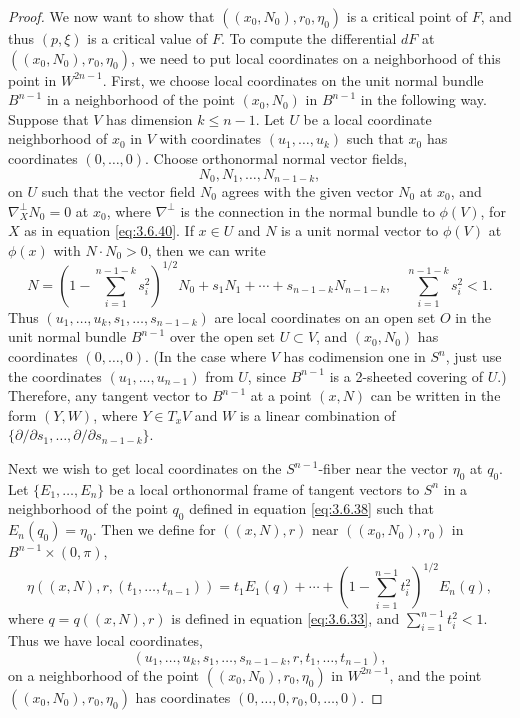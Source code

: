 \documentclass[12pt]{article}
\begin{document}
\begin{proof}
We now want to show that $((x_0,N_0), r_0, \eta_0)$ is a critical point of $F$, and thus $(p,\xi)$ is a critical
value of $F$. To compute the differential $dF$ at $((x_0,N_0), r_0, \eta_0)$, we need to put local coordinates
on a neighborhood of this point in $W^{2n-1}$.  First, we choose local coordinates on the unit normal  bundle
$B^{n-1}$ in a neighborhood of the point $(x_0, N_0)$ in $B^{n-1}$ in the following way.  
Suppose that $V$ has dimension $k \leq n-1$.
Let $U$ be a local coordinate neighborhood of $x_0$ in $V$ with coordinates $(u_1,\ldots,u_k)$ such that
$x_0$ has coordinates $(0,\ldots,0)$.  Choose orthonormal
normal vector fields, 
\begin{displaymath}
N_0,N_1,\ldots,N_{n-1-k},
\end{displaymath}
on $U$ such that the vector field $N_0$ agrees with the given vector $N_0$ at $x_0$, and $\nabla_X^\perp N_0 = 0$
at $x_0$, where $\nabla^\perp$ is the connection in the normal 
bundle to $\phi (V)$, for $X$ as in equation \eqref{eq:3.6.40}.  If $x \in U$ and
$N$ is a unit normal vector to $\phi (V)$ at $\phi(x)$ with $N \cdot N_0 > 0$, then we can write
\begin{equation}
\label{eq:3.6.41}
N = (1 - \sum_{i=1}^{n-1-k} s_i^2)^{1/2}N_0 + s_1 N_1+ \cdots + s_{n-1-k} N_{n-1-k}, 
\quad \sum_{i=1}^{n-1-k} s_i^2 < 1. 
\end{equation}
Thus $(u_1,\ldots,u_k,s_1,\ldots,s_{n-1-k})$ are local coordinates on an open set $O$ in 
the unit normal bundle $B^{n-1}$ over the
open set $U \subset V$, and $(x_0,N_0)$ has coordinates $(0,\ldots,0)$. 
(In the case where $V$ has codimension one in $S^n$, just use the coordinates
$(u_1,\ldots,u_{n-1})$ from $U$, since $B^{n-1}$ is a 2-sheeted covering of $U$.) 
Therefore, any tangent vector to $B^{n-1}$ at a point $(x,N)$ can be written in the
form $(Y,W)$, where $Y \in T_xV$ and $W$ is a linear combination of $\{\partial /\partial s_1,\ldots,\partial /\partial 
s_{n-1-k}\}$.

Next we wish to get local coordinates on the $S^{n-1}$-fiber near the vector $\eta_0$ at $q_0$.    
Let $\{E_1,\ldots,E_n\}$ be a local orthonormal frame of tangent vectors to $S^n$ in a neighborhood of the
point $q_0$ defined in equation \eqref{eq:3.6.38} such that $E_n(q_0) = \eta_0$.  Then we define
for $((x,N),r)$ near $((x_0,N_0),r_0)$ in $B^{n-1} \times (0,\pi)$,
\begin{equation}
\label{eq:3.6.36}
\eta((x,N),r,(t_1,\ldots,t_{n-1})) = t_1 E_1 (q) + \cdots + (1 - \sum_{i=1}^{n-1} t_i^2)^{1/2} E_n (q),
\end{equation}
where $q = q((x,N),r)$ is defined in equation \eqref{eq:3.6.33}, and $\sum_{i=1}^{n-1} t_i^2 < 1$. 
Thus we have local coordinates, 
\begin{displaymath}
(u_1,\ldots,u_k,s_1,\ldots,s_{n-1-k}, r, t_1,\ldots,t_{n-1}),
\end{displaymath}
on a neighborhood
of the point $((x_0,N_0),r_0,\eta_0)$ in $W^{2n-1}$, and the point $((x_0,N_0),r_0,\eta_0)$ has coordinates
$(0,\ldots,0,r_0,0,\ldots,0)$.
 

\end{proof}
\end{document}
